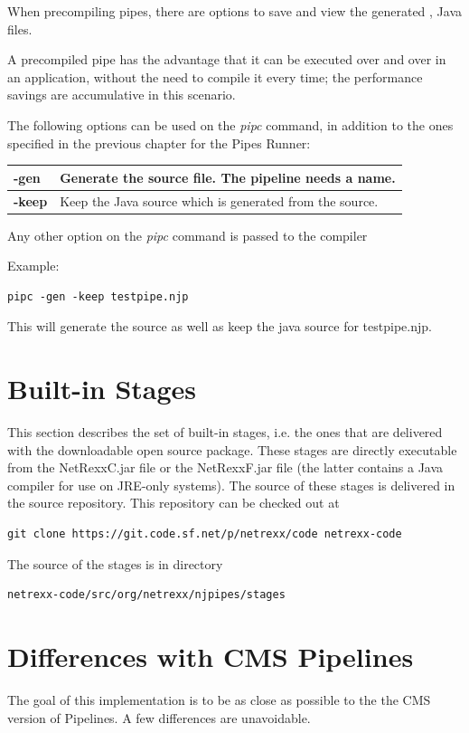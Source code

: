When precompiling pipes, there are options to save and view the
generated \nr{}, Java files.

A precompiled pipe has
the advantage that it can be executed over and over in an application,
without the need to compile it every time; the performance savings are
accumulative in this scenario.

The following options can be used on the \emph{pipc} command, in
addition to the ones specified in the previous chapter for the Pipes Runner:

\begin{tabularx}{\textwidth}{>{\bfseries}lX}
\toprule
-gen&Generate the \nr{} source file. The pipeline needs a name.
\\\midrule
-keep&Keep the Java source which is generated from the \nr{} source.
\\\bottomrule
\end{tabularx}
Any other option on the \emph{pipc} command is passed to the \nr compiler

Example:
\begin{lstlisting}
pipc -gen -keep testpipe.njp
\end{lstlisting}
This will generate the \nr{} source as well as keep the java source for testpipe.njp.


\chapter{Built-in Stages} \label{BuiltinStages} 
This section describes the set of built-in stages, i.e. the ones that
are delivered with the downloadable open source package. These stages
are directly executable from the NetRexxC.jar file or the NetRexxF.jar
file (the latter contains a Java compiler for use on JRE-only
systems).
The source of these stages is delivered in the \nr{}
source repository. This repository can be checked out at
\begin{lstlisting}
git clone https://git.code.sf.net/p/netrexx/code netrexx-code
\end{lstlisting}
The source of the stages is in directory
\begin{lstlisting}
netrexx-code/src/org/netrexx/njpipes/stages
\end{lstlisting}




\chapter{Differences with CMS Pipelines}
The goal of this implementation is to be as close as possible to the
the CMS version of Pipelines. A few differences are unavoidable.

